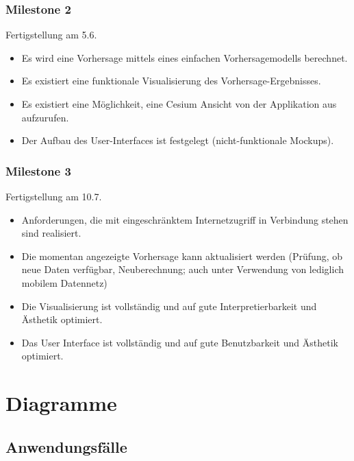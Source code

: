 \documentclass[12pt]{article} %
\begin{document}
\subsubsection*{Milestone 2} \label{ms2}
Fertigstellung am 5.6.
\begin{itemize} 
	\item Es wird eine Vorhersage mittels eines einfachen Vorhersagemodells berechnet.
	\item Es existiert eine funktionale Visualisierung des Vorhersage-Ergebnisses.
	\item Es existiert eine Möglichkeit, eine Cesium Ansicht von der Applikation aus aufzurufen.
	\item Der Aufbau des User-Interfaces ist festgelegt (nicht-funktionale Mockups).
\end{itemize}

\vspace{1em}

\subsubsection*{Milestone 3} \label{ms3}
Fertigstellung am 10.7.
\begin{itemize} 
	\item Anforderungen, die mit eingeschränktem Internetzugriff in Verbindung stehen sind realisiert.
	\item Die momentan angezeigte Vorhersage kann aktualisiert werden (Prüfung, ob neue Daten verfügbar, Neuberechnung; auch unter Verwendung von lediglich mobilem Datennetz)
	\item Die Visualisierung ist vollständig und auf gute Interpretierbarkeit und Ästhetik optimiert.
	\item Das User Interface ist vollständig und auf gute Benutzbarkeit und Ästhetik optimiert.
\end{itemize} 



\newpage
\section{Diagramme} \label{diagramme}

\subsection{Anwendungsfälle}
\end{document}
